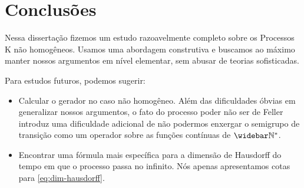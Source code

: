 \chapter{Conclusões}
\label{cap:conclusao}

Nessa dissertação fizemos um estudo razoavelmente completo sobre os
Processos K não homogêneos. Usamos uma abordagem construtiva e
buscamos ao máximo manter nossos argumentos em nível elementar,
sem abusar de teorias sofisticadas.

Para estudos futuros, podemos sugerir:

\begin{itemize}
\item Calcular o gerador no caso não homogêneo. Além das dificuldades
  óbvias em generalizar nossos argumentos, o fato do processo poder
  não ser de Feller introduz uma dificuldade adicional de não podermos
  enxergar o semigrupo de transição como um operador sobre as funções
  contínuas de $\Nzb$.

\item Encontrar uma fórmula mais específica para a dimensão de
  Hausdorff do tempo em que o processo passa no infinito. Nós
  apenas apresentamos cotas para \eqref{eq:dim-hausdorff}.
\end{itemize}




